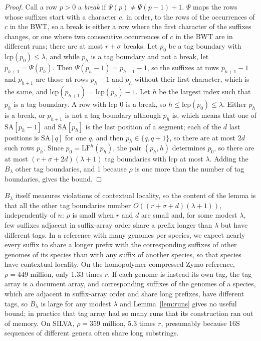 \begin{proof}
Call a row $p > 0$ a \emph{break} if $\Psi(p) \neq \Psi(p - 1) + 1$.
$\Psi$ maps the rows whose suffixes start with a character $c$, in order, to the rows of the occurrences of $c$ in the BWT, so a break is either a row where the first character of the suffixes changes, or one where two consecutive occurrences of $c$ in the BWT are in different runs; there are at most $r + \sigma$ breaks.
Let $p_0$ be a tag boundary with $\mathrm{lcp}(p_0) \leq \lambda$, and while $p_h$ is a tag boundary and not a break, let $p_{h + 1} = \Psi(p_h)$.
Then $\Psi(p_h - 1) = p_{h + 1} - 1$, so the suffixes at rows $p_{h + 1} - 1$ and $p_{h + 1}$ are those at rows $p_h - 1$ and $p_h$ without their first character, which is the same, and $\mathrm{lcp}(p_{h + 1}) = \mathrm{lcp}(p_h) - 1$.
Let $h$ be the largest index such that $p_h$ is a tag boundary.
A row with lcp $0$ is a break, so $h \leq \mathrm{lcp}(p_0) \leq \lambda$.
Either $p_h$ is a break, or $p_{h + 1}$ is not a tag boundary although $p_h$ is, which means that one of $\mathrm{SA}[p_h - 1]$ and $\mathrm{SA}[p_h]$ is the last position of a segment; each of the $d$ last positions is $\mathrm{SA}[q]$ for one $q$, and then $p_h \in \{q, q + 1\}$, so there are at most $2d$ such rows $p_h$.
Since $p_0 = \mathrm{LF}^h(p_h)$, the pair $(p_h, h)$ determines $p_0$, so there are at most $(r + \sigma + 2d)(\lambda + 1)$ tag boundaries with lcp at most $\lambda$.
Adding the $B_\lambda$ other tag boundaries, and 1 because $\rho$ is one more than the number of tag boundaries, gives the bound.
\end{proof}

$B_\lambda$ itself measures violations of contextual locality, so the content of the lemma is that all the other tag boundaries number $O((r + \sigma + d)(\lambda + 1))$, independently of $n$: $\rho$ is small when $r$ and $d$ are small and, for some modest $\lambda$, few suffixes adjacent in suffix-array order share a prefix longer than $\lambda$ but have different tags.
In a reference with many genomes per species, we expect nearly every suffix to share a longer prefix with the corresponding suffixes of other genomes of its species than with any suffix of another species, so that species have contextual locality.
On the homopolymer-compressed Zymo reference, $\rho = 449$ million, only 1.33 times $r$.
If each genome is instead its own tag, the tag array is a document array, and corresponding suffixes of the genomes of a species, which are adjacent in suffix-array order and share long prefixes, have different tags, so $B_\lambda$ is large for any modest $\lambda$ and Lemma~\ref{lem:runs} gives no useful bound; in practice that tag array had so many runs that its construction ran out of memory.
On SILVA, $\rho = 359$ million, 5.3 times $r$, presumably because 16S sequences of different genera often share long substrings.

